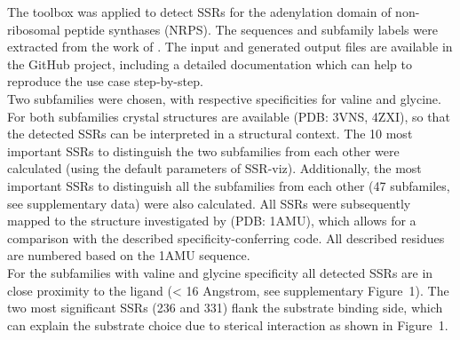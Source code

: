 \documentclass{bioinfo}
\begin{document}
The toolbox was applied to detect SSRs for the adenylation domain of   
non-ribosomal peptide synthases (NRPS). 
The sequences and subfamily labels were extracted from the work of \citealp{Rausch01}.
The input and generated output files are available in the GitHub project,
including a detailed documentation which can help to reproduce the use 
case step-by-step. \\
Two subfamilies were chosen, with respective specificities 
for valine and glycine. 
For both subfamilies crystal structures are available (PDB: 3VNS, 4ZXI),
so that the detected SSRs can be interpreted in a structural context. 
The 10 most important SSRs to distinguish the two subfamilies from each other 
were calculated (using the default parameters of SSR-viz). 
Additionally, the most important SSRs
to distinguish all the subfamilies from each other (47 subfamiles, see supplementary data)
were also calculated. 
All SSRs were subsequently mapped to the structure investigated by \citealp{Stachelhaus01} (PDB: 1AMU), which allows for a
comparison with the described specificity-conferring code.
All described residues are numbered based on the 1AMU sequence. 
\\
%
%
For the subfamilies with valine and glycine specificity all detected SSRs 
are in close proximity to the ligand (< 16 Angstrom, see supplementary Figure~1). The two most significant 
SSRs (236 and 331) flank the substrate binding side, which can explain the substrate choice due
to sterical interaction as shown in Figure~1\vphantom{\ref{fig:01}}. 
\end{document}
